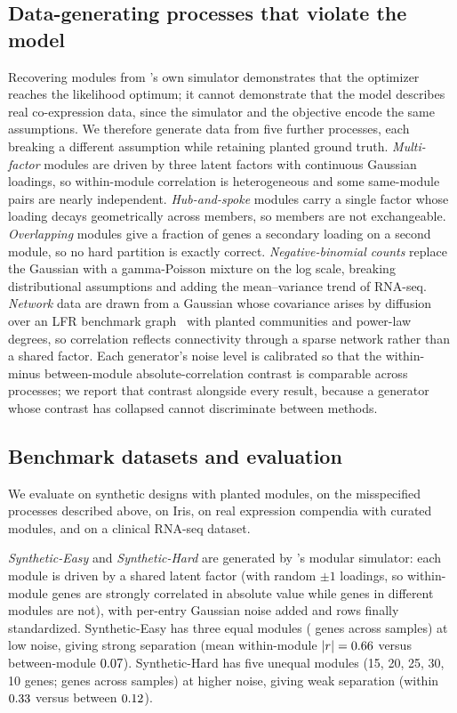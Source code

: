 \subsection*{Data-generating processes that violate the model}
\label{sec:misspec}
Recovering modules from \tool{}'s own simulator demonstrates that the optimizer
reaches the likelihood optimum; it cannot demonstrate that the model describes
real co-expression data, since the simulator and the objective encode the same
assumptions. We therefore generate data from five further processes, each
breaking a different assumption while retaining planted ground truth.
\emph{Multi-factor} modules are driven by three latent factors with continuous
Gaussian loadings, so within-module correlation is heterogeneous and some
same-module pairs are nearly independent. \emph{Hub-and-spoke} modules carry a
single factor whose loading decays geometrically across members, so members are
not exchangeable. \emph{Overlapping} modules give a fraction of genes a secondary
loading on a second module, so no hard partition is exactly correct.
\emph{Negative-binomial counts} replace the Gaussian with a gamma-Poisson
mixture on the log scale, breaking distributional assumptions and adding the
mean--variance trend of RNA-seq. \emph{Network} data are drawn from a Gaussian
whose covariance arises by diffusion over an LFR benchmark
graph~\cite{LancichinettiFortunato2008} with planted communities and power-law
degrees, so correlation reflects connectivity through a sparse network rather
than a shared factor. Each generator's noise level is calibrated so that the
within- minus between-module absolute-correlation contrast is comparable across
processes; we report that contrast alongside every result, because a generator
whose contrast has collapsed cannot discriminate between methods.

\subsection*{Benchmark datasets and evaluation}
We evaluate on synthetic designs with planted modules, on the misspecified processes described above, on Iris, on real expression compendia with curated modules, and on a clinical RNA-seq dataset.

\emph{Synthetic-Easy} and \emph{Synthetic-Hard} are generated by \tool{}'s
modular simulator: each module is driven by a shared latent factor (with random
$\pm 1$ loadings, so within-module genes are strongly correlated in absolute
value while genes in different modules are not), with per-entry Gaussian noise
added and rows finally standardized. Synthetic-Easy has three equal modules
(\EasyGenes{} genes across \EasySamples{} samples) at low noise, giving strong
separation (mean within-module $\lvert r\rvert = 0.66{}$ versus
between-module $0.07{}$). Synthetic-Hard has five unequal modules
(15, 20, 25, 30, 10 genes; \HardGenes{} genes across \HardSamples{} samples) at
higher noise, giving weak separation (within $0.33{}$ versus between
$0.12{}$).

